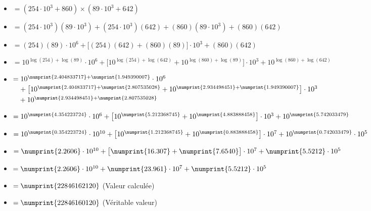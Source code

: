 \documentclass[a4paper]{article}
\begin{document}
\begin{itemize}
\begin{small}
\begin{itemize}
		\item[] $= (254 \cdot 10^{3} + 860) \times (89 \cdot 10^{3} + 642)$
		\vspace{0.1 cm}
		\item[] $= (254 \cdot 10^{3})(89 \cdot 10^{3}) + (254 \cdot 10^{3})(642) + (860)(89 \cdot 10^{3}) + (860)(642)$
		\vspace{0.1 cm}
		\item[] $= (254)(89)\cdot 10^{6} + \big[(254)(642) + (860)(89)\big] \cdot 10^{3} + (860)(642)$
		\vspace{0.1 cm}
		\item[] $= 10^{\log(254)+\log(89)} \cdot 10^{6} + \big[10^{\log(254)+\log(642)} + 10^{\log(860)+\log(89)}\big] \cdot 10^{3} + 10^{\log(860)+\log(642)}$
		\vspace{0.1 cm}
		\item[] $= 10^{\numprint{2.404833717}+\numprint{1.949390007}} \cdot 10^{6}$\\
		$\phantom{=} + \big[10^{\numprint{2.404833717}+\numprint{2.807535028}} + 10^{\numprint{2.934498451}+\numprint{1.949390007}}\big] \cdot 10^{3}$\\
		$\phantom{=} + 10^{\numprint{2.934498451}+\numprint{2.807535028}}$
		\vspace{0.1 cm}
		\item[] $= 10^{\numprint{4.354223724}} \cdot 10^{6} + \big[10^{\numprint{5.212368745}} + 10^{\numprint{4.883888458}}\big] \cdot 10^{3} + 10^{\numprint{5.742033479}}$
		\vspace{0.1 cm}
		\item[] $= 10^{\numprint{0.354223724}} \cdot 10^{10} + \big[10^{\numprint{1.212368745}} + 10^{\numprint{0.883888458}}\big] \cdot 10^{7} + 10^{\numprint{0.742033479}} \cdot 10^{5}$
		\vspace{0.1 cm}
		\item[] $= \numprint{2.2606} \cdot 10^{10} + \big[\numprint{16.307} + \numprint{7.6540}\big] \cdot 10^{7} + \numprint{5.5212} \cdot 10^{5}$
		\vspace{0.1 cm}
		\item[] $= \numprint{2.2606} \cdot 10^{10} + \numprint{23.961} \cdot 10^{7} + \numprint{5.5212} \cdot 10^{5}$
		\vspace{0.2 cm}
		\item[] $= \numprint{22846162120}$ (Valeur calculée)
		\vspace{0.1 cm}
		\item[] $= \numprint{22846160120}$ (Véritable valeur)\\
	\end{itemize}
	

\end{small}
\end{itemize}
\end{document}
